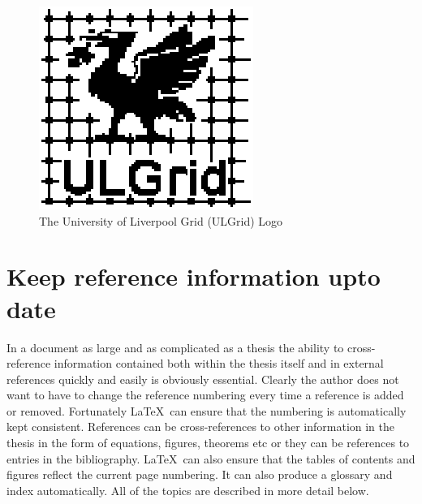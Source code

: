 \documentclass[11pt,oneside]{book}
\begin{document}
\begin{figure}[htp]
\centering
\includegraphics{ulgrid.eps}
\caption{The University of Liverpool Grid (ULGrid) Logo}
\label{fig:logo}
\end{figure}

\section{Keep reference information upto date }

In a document as large and as complicated as a thesis the ability to
cross-reference information contained both within the thesis itself
and in external references quickly and easily is obviously essential. 
Clearly the author does not want to have to change the reference 
numbering every time a reference is added or removed. Fortunately
\LaTeX \ can ensure that the numbering is automatically kept
consistent. References can be cross-references to other information
in the thesis in the form of equations, figures, theorems etc
or they can be references to entries in the bibliography. \LaTeX \ can
also ensure that the tables of contents and figures reflect the current
page numbering. It can also produce a glossary and index automatically. All
of the topics are described in more detail below.
\end{document}
